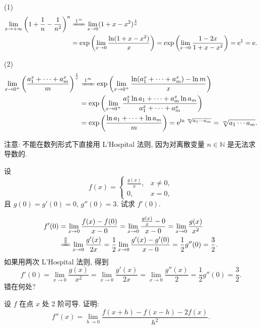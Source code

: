 \begin{solution}
(1)
\[
\begin{aligned}
\lim_{x\to+\infty}\left(1+\frac{1}{n}-\frac{1}{n^{2}}\right)^{n}&\xlongequal{1^{\infty}}\lim_{x\to0}(1+x-x^{2})^{\frac{1}{x}}\\
&=\exp\left(\lim_{x\to0}\frac{\ln(1+x-x^{2})}{x}\right)=\exp\left(\lim_{x\to0}\frac{1-2x}{1+x-x^{2}}\right)=\mathrm{e}^{1}=\mathrm{e}.
\end{aligned}
\]

(2)
\[
\begin{aligned}
\lim_{x\to0^{+}}\left(\frac{a_1^{x}+\cdots+a_m^{x}}{m}\right)^{\frac{1}{x}}&\xlongequal{1^{\infty}}\exp\left(\lim_{x\to0^{+}}\frac{\ln(a_1^{x}+\cdots+a_m^{x})-\ln m}{x}\right)\\
&=\exp\left(\lim_{x\to0^{+}}\frac{a_1^{x}\ln a_1+\cdots+a_m^{x}\ln a_m}{a_1^{x}+\cdots+a_m^{x}}\right)\\
&=\exp\left(\frac{\ln a_1+\cdots+\ln a_m}{m}\right)=\mathrm{e}^{\ln\sqrt[m]{a_1\cdots a_m}}=\sqrt[m]{a_1\cdots a_m}.
\end{aligned}
\]
\end{solution}

注意: 不能在数列形式下直接用 L'Hospital 法则, 因为对离散变量 $n\in\mathbb{N}$ 是无法求导数的.

\begin{example}\label{ex:3.4.7}
设
\[
f(x)=\begin{cases}\frac{g(x)}{x}, & x\neq0,\\ 0, & x=0,\end{cases}
\]
且 $g(0)=g'(0)=0$, $g''(0)=3$. 试求 $f'(0)$.
\end{example}

\begin{solution}
\[
\begin{aligned}
f'(0)&=\lim_{x\to0}\frac{f(x)-f(0)}{x-0}=\lim_{x\to0}\frac{\frac{g(x)}{x}-0}{x-0}=\lim_{x\to0}\frac{g(x)}{x^{2}}\\
&\xlongequal{\frac{0}{0}}\lim_{x\to0}\frac{g'(x)}{2x}=\frac{1}{2}\lim_{x\to0}\frac{g'(x)-g'(0)}{x-0}=\frac{1}{2}g''(0)=\frac{3}{2}.
\end{aligned}
\]
如果用两次 L'Hospital 法则, 得到
\[
f'(0)=\lim_{x\to0}\frac{g(x)}{x^{2}}=\lim_{x\to0}\frac{g'(x)}{2x}=\lim_{x\to0}\frac{g''(x)}{2}=\frac{1}{2}g''(0)=\frac{3}{2}.
\]
错在何处?
\end{solution}

\begin{example}\label{ex:3.4.8}
设 $f$ 在点 $x$ 处 2 阶可导. 证明:
\[
f''(x)=\lim_{h\to0}\frac{f(x+h)-f(x-h)-2f(x)}{h^{2}}.
\]
\end{example}

